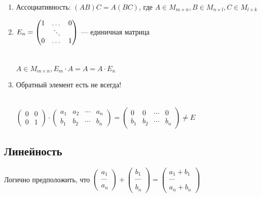 \begin{enumerate}
    \item Ассоциативность: $(AB)C = A(BC)$, где $A \in M_{m \times n}, B \in M_{n \times l}, C \in M_{l \times k} $\\
    \item $E_n = \begin{pmatrix}
        1 & \dots &0\\
        &\rotatebox{135}{$\cdots$}&\\
        0&\dots&1 
    \end{pmatrix}$ --- единичная матрица \\\\\\
    $A \in M_{m\times n}, E_m \cdot A = A = A \cdot E_n$
    \item Обратный элемент есть не всегда!\\\\
    \begin{example}
        $\begin{pmatrix}
            0&0\\
            0&1
        \end{pmatrix} \cdot 
        \begin{pmatrix} 
            a_1& a_2 & \cdots & a_n \\
            b_1& b_2 & \cdots & b_n 
        \end{pmatrix} = \begin{pmatrix}
            0&0&\cdots&0 \\
            b_1 & b_2 & \cdots & b_n 
        \end{pmatrix} \not = E$
    \end{example}
\end{enumerate}

\subsection{Линейность}

\begin{remark}
    Логично предположить, что $\begin{pmatrix}
        a_1\\
        \cdots\\
        a_n
    \end{pmatrix} + \begin{pmatrix}
        b_1\\
        \cdots\\
        b_n
    \end{pmatrix} = \begin{pmatrix}
        a_1 + b_1\\
        \cdots\\
        a_n + b_n
    \end{pmatrix}$
\end{remark}

